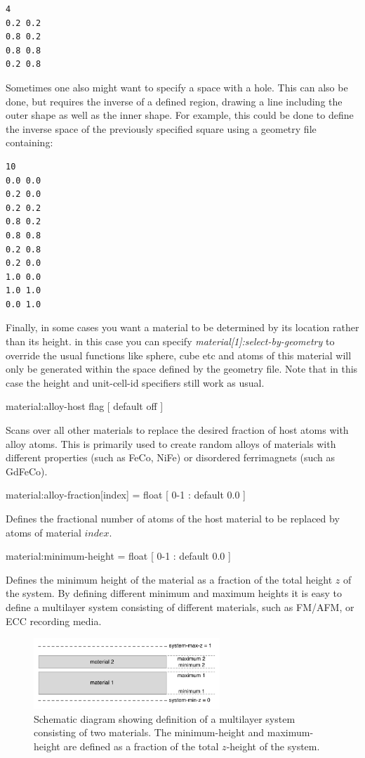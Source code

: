 \begin{verbatim}
4
0.2 0.2
0.8 0.2
0.8 0.8
0.2 0.8
\end{verbatim}

Sometimes one also might want to specify a space with a hole. This can also be
done, but requires the inverse of a defined region, drawing a line including the
outer shape as well as the inner shape. For example, this could be done to
define the inverse space of the previously specified square using a
geometry file containing:

\begin{verbatim}
10
0.0 0.0
0.2 0.0
0.2 0.2
0.8 0.2
0.8 0.8
0.2 0.8
0.2 0.0
1.0 0.0
1.0 1.0
0.0 1.0
\end{verbatim}

Finally, in some cases you want a material to be determined by its location
rather than its height. in this case you can specify
\textit{material[1]:select-by-geometry} to override the usual functions like
sphere, cube etc and atoms of this material will only be generated within the
space defined by the geometry file. Note that in this case the height and
unit-cell-id specifiers still work as usual.

{\zicf material:alloy-host flag [ default off ]}
Scans over all other materials to replace the desired fraction of host
atoms with alloy atoms. This is primarily used to create random alloys of
materials with different properties (such as FeCo, NiFe) or disordered
ferrimagnets (such as GdFeCo).


{\zicf material:alloy-fraction[index] = float [ 0-1 : default 0.0 ]}
Defines the fractional number of atoms of the host material to be replaced
by atoms of material $index$.

{\zicf material:minimum-height = float [ 0-1 : default 0.0 ]}
Defines the minimum height of the material as a fraction of the total height
$z$ of the system. By defining different minimum and maximum heights it is easy
to define a multilayer system consisting of different materials, such as FM/AFM,
or ECC recording media.

\begin{figure}[!h]
\center
\includegraphics[width=7cm]{figures/multilayers.pdf}
\caption{Schematic diagram showing definition of a multilayer system consisting
of two materials. The minimum-height and maximum-height are defined as a
fraction of the total $z$-height of the system.}
\label{fig:multilayer}
\end{figure}

